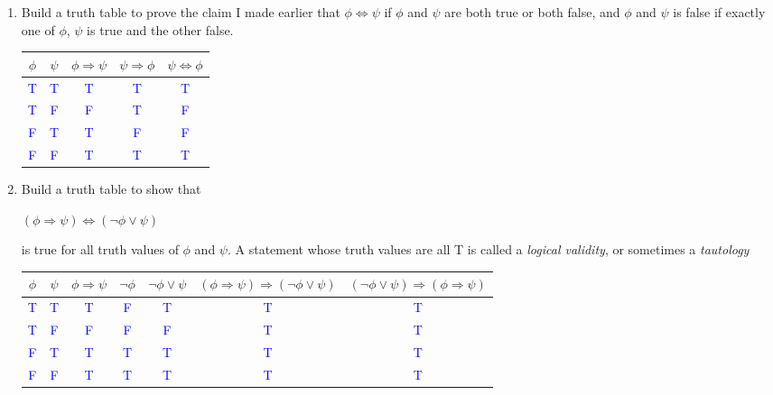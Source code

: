 \documentclass[13.5pt]{article}
\begin{document}
\begin{enumerate}
\item{Build a truth table to prove the claim I made earlier that \(\phi \Leftrightarrow \psi \) if \(\phi\) and \(\psi\) are both true or both false, and \(\phi\) and \(\psi\) is false if exactly one of \(\phi\), \(\psi\) is true and the other false.}

\begin{center}
\begin{tabular}{ c c c c c}
 \(\phi\) & \(\psi\) & \(\phi \Rightarrow \psi\) & \(\psi \Rightarrow \phi\) & \(\psi \Leftrightarrow \phi\) \\ 
\hline
 \textcolor{blue}{T} & \textcolor{blue}{T} & \textcolor{blue}{T} & \textcolor{blue}{T} & \textcolor{blue}{T}\\ 
 \textcolor{blue}{T} & \textcolor{blue}{F} & \textcolor{blue}{F} & \textcolor{blue}{T} & \textcolor{blue}{F}\\ 
 \textcolor{blue}{F} & \textcolor{blue}{T} & \textcolor{blue}{T} & \textcolor{blue}{F} & \textcolor{blue}{F}\\ 
 \textcolor{blue}{F} & \textcolor{blue}{F} & \textcolor{blue}{T} & \textcolor{blue}{T} & \textcolor{blue}{T}\\ 
\end{tabular}
\end{center}

\item{Build a truth table to show that}
\begin{center}
\((\phi \Rightarrow \psi) \Leftrightarrow (\neg \phi \vee \psi)\)
\end{center}

{is true for all truth values of \(\phi\) and \(\psi\). A statement whose truth values are all T is called a \textit{logical
validity}, or sometimes a \textit{tautology}}

\begin{center}
\begin{tabular}{ c c c c c c c}
 \(\phi\) & \(\psi\) & \(\phi \Rightarrow \psi\) & \(\neg \phi\) & \(\neg \phi \vee \psi\) & \((\phi \Rightarrow \psi) \Rightarrow (\neg \phi \vee \psi)\) & \((\neg \phi \vee \psi) \Rightarrow (\phi \Rightarrow \psi)\) \\ 
\hline
 \textcolor{blue}{T} & \textcolor{blue}{T} & \textcolor{blue}{T} & \textcolor{blue}{F} & \textcolor{blue}{T} & \textcolor{blue}{T} & \textcolor{blue}{T} \\ 
 \textcolor{blue}{T} & \textcolor{blue}{F} & \textcolor{blue}{F} & \textcolor{blue}{F} & \textcolor{blue}{F} & \textcolor{blue}{T} & \textcolor{blue}{T} \\ 
 \textcolor{blue}{F} & \textcolor{blue}{T} & \textcolor{blue}{T} & \textcolor{blue}{T} & \textcolor{blue}{T} & \textcolor{blue}{T} & \textcolor{blue}{T}\\ 
 \textcolor{blue}{F} & \textcolor{blue}{F} & \textcolor{blue}{T} & \textcolor{blue}{T} & \textcolor{blue}{T} & \textcolor{blue}{T} & \textcolor{blue}{T} 
\end{tabular}
\end{center}


\end{enumerate}
\end{document}
